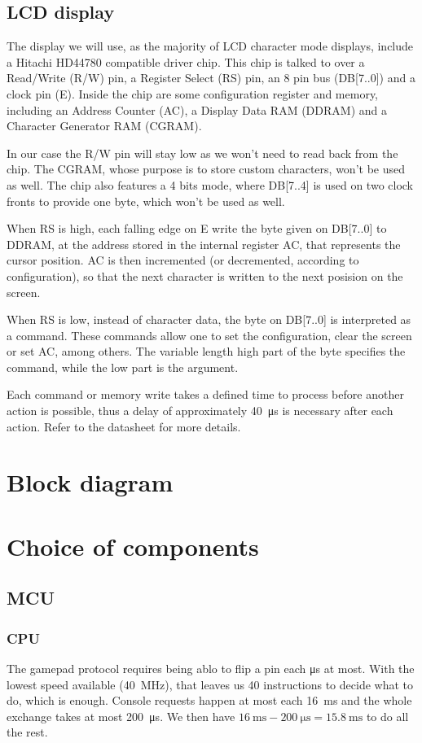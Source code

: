 \documentclass[a4paper,oneside,12pt]{article}
\begin{document}
\subsection{LCD display}
The display we will use, as the majority of LCD character mode displays, include
a Hitachi HD44780 compatible driver chip. This chip is talked to over a
Read/Write (R/W) pin, a Register Select (RS) pin, an 8 pin bus (DB[7..0]) and a
clock pin (E). Inside the chip are some configuration register and memory,
including an Address Counter (AC), a Display Data RAM (DDRAM) and a Character
Generator RAM (CGRAM).

In our case the R/W pin will stay low as we won't need to read back from the
chip. The CGRAM, whose purpose is to store custom characters, won't be used as
well. The chip also features a 4 bits mode, where DB[7..4] is used on two clock
fronts to provide one byte, which won't be used as well.

When RS is high, each falling edge on E write the byte given on DB[7..0] to
DDRAM, at the address stored in the internal register AC, that represents the
cursor position. AC is then incremented (or decremented, according to
configuration), so that the next character is written to the next posision on
the screen.

When RS is low, instead of character data, the byte on DB[7..0] is interpreted
as a command. These commands allow one to set the configuration, clear the
screen or set AC, among others. The variable length high part of the byte
specifies the command, while the low part is the argument.

Each command or memory write takes a defined time to process before another
action is possible, thus a delay of approximately \SI{40}{\us} is necessary
after each action. Refer to the datasheet for more details.

\section{Block diagram}

\section{Choice of components}
\subsection{MCU}
\subsubsection{CPU}
The gamepad protocol requires being ablo to flip a pin each \si{\us} at
most. With the lowest speed available (\SI{40}{\MHz}), that leaves us 40
instructions to decide what to do, which is enough. Console requests happen at
most each \SI{16}{\ms} and the whole exchange takes at most \SI{200}{\us}. We
then have $\SI{16}{\ms} - \SI{200}{\us} = \SI{15.8}{\ms}$ to do all the rest.
\end{document}
